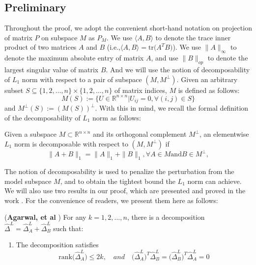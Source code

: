 \documentclass[AMS,STIX1COL]{WileyNJD-v2}
\begin{document}
{\subsection{Preliminary}
Throughout the proof, we adopt the convenient short-hand notation on projection of matrix $P$ on subspace $M$ as $P_{M}$.
We use $\langle A,B \rangle$ to denote the trace inner product of two matrices $A$ and $B$ \big(i.e.,$\langle A,B \rangle=\mbox{tr}\big(A^T B\big)$\big).
We use $\|A\|_{\infty}$ to denote the maximum absolute entry of matrix $A$, and use $\|B\|_{op}$ to denote the largest singular value of matrix $B$.
And we will use the notion of decomposability of $L_1$ norm with respect to a pair of subspace $(M,M^{\perp})$.
Given an arbitrary subset $S \subseteq \{1,2,\dots,n\} \times \{1,2,\dots,n\}$ of matrix indices, $M$ is defined as follows:
\[
    M(S):=\{ U \in \mathbb{R}^{n \times n} | U_{ij}=0, \forall (i,j) \in S \}
\]
and $M^{\perp}(S):=(M(S))^{\perp}$.
With this in mind, we recall the formal definition of the decomposability of $L_1$ norm as follows:
\begin{definition}
    Given a subspace $M \subset \mathbb{R}^{n \times n}$ and its orthogonal complement $M^{\perp}$, an elementwise $L_1$ norm
    is decomposable with respect to $(M, M^{\perp})$ if
    \[
        \| A + B \|_{1} = \|A\|_{1} + \|B\|_{1},
        \forall A \in M \mbox{and} B \in M^{\perp},
    \]
\end{definition}
The notion of decomposability is used to penalize the perturbation from the model subspace $M$, and to obtain the tightest bound the $L_1$ norm can achieve.
We will also use two results in our proof, which are presented and proved in the work \cite{agarwal2012noisy}.
For the convenience of readers, we present them here as follows:
\begin{lemma} \label{eq:Lmag}
(\textbf{Agarwal, et al} \cite{agarwal2012noisy})
For any $k=1,2,\dots,n$, there is a decomposition $\widehat{\Delta}^{L} =\widehat{\Delta}^{L}_{A} + \widehat{\Delta}^{L}_{B}$ such that:
\begin{enumerate}
 \item The decomposition satisfies
    \begin{equation}\label{eq:Lm1}
        \mbox{rank}\big(\widehat{\Delta}^{L}_{A}\big) \leq 2k, \quad and \quad \big(\widehat{\Delta}^{L}_{A}\big)^{T}\widehat{\Delta}^{L}_{B}
        = \big(\widehat{\Delta}^{L}_{B}\big)^{T}\widehat{\Delta}^{L}_{A} =0

\end{equation}
\end{enumerate}
\end{lemma}}
\end{document}
